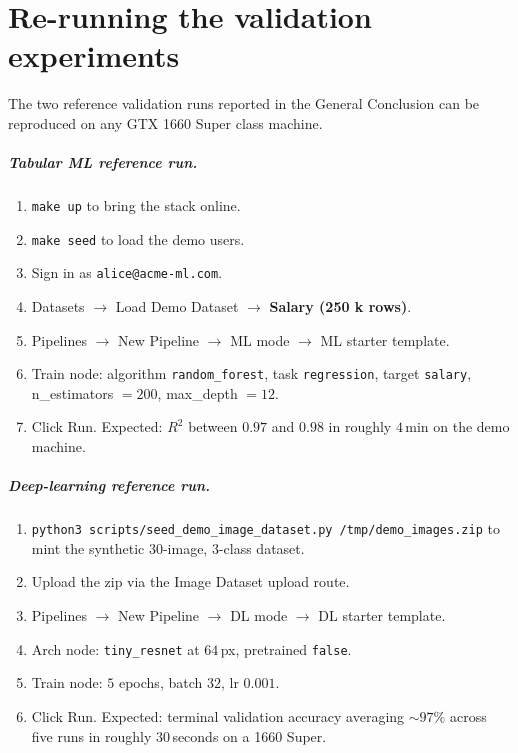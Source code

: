 \documentclass[12pt, a4paper, oneside]{report}
\begin{document}
\chapter{Re-running the validation experiments}
\label{annex:validation}

The two reference validation runs reported in the General Conclusion
can be reproduced on any GTX 1660 Super class machine.

\paragraph{Tabular ML reference run.}
\begin{enumerate}
    \item \texttt{make up} to bring the stack online.
    \item \texttt{make seed} to load the demo users.
    \item Sign in as \texttt{alice@acme-ml.com}.
    \item Datasets $\to$ Load Demo Dataset $\to$ \textbf{Salary (250 k rows)}.
    \item Pipelines $\to$ New Pipeline $\to$ ML mode $\to$ ML starter
        template.
    \item Train node: algorithm \texttt{random\_forest}, task
        \texttt{regression}, target \texttt{salary}, n\_estimators
        $= 200$, max\_depth $= 12$.
    \item Click Run. Expected: $R^2$ between $0.97$ and $0.98$ in
        roughly $4$\,min on the demo machine.
\end{enumerate}

\paragraph{Deep-learning reference run.}
\begin{enumerate}
    \item \texttt{python3 scripts/seed\_demo\_image\_dataset.py
        /tmp/demo\_images.zip} to mint the synthetic 30-image,
        3-class dataset.
    \item Upload the zip via the Image Dataset upload route.
    \item Pipelines $\to$ New Pipeline $\to$ DL mode $\to$ DL starter
        template.
    \item Arch node: \texttt{tiny\_resnet} at $64$\,px,
        pretrained \texttt{false}.
    \item Train node: $5$ epochs, batch $32$, lr $0.001$.
    \item Click Run. Expected: terminal validation accuracy averaging
        $\sim 97\%$ across five runs in roughly $30$\,seconds on a
        1660 Super.
\end{enumerate}
\end{document}

